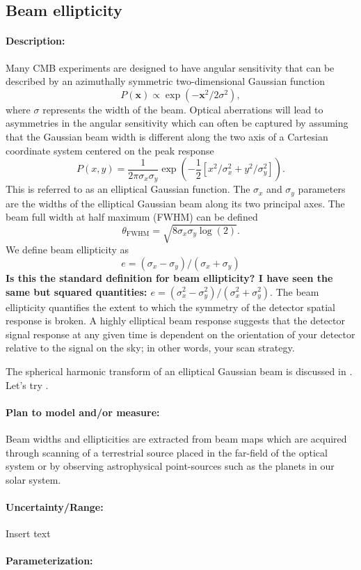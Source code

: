\subsection{Beam ellipticity}

\paragraph{Description:}
Many CMB experiments are designed to have angular sensitivity that can be described by an azimuthally symmetric two-dimensional Gaussian function
\begin{equation} 
P (\mathbf{x}) \propto \exp (-\mathbf{x} ^2/2\sigma ^2),
\end{equation}
where $\sigma$ represents the width of the beam. Optical aberrations will lead to asymmetries in the angular sensitivity which can often be captured by assuming that the Gaussian beam width is different along the two axis of a Cartesian coordinate system centered on the peak response
\begin{equation}
P (x,y) = \frac{1}{2\pi \sigma_x \sigma_y} \exp (-\frac{1}{2}[x^2/\sigma ^2_x + y^2/\sigma ^2_y]).
\end{equation}
This is referred to as an elliptical Gaussian function. The $\sigma_x$ and $\sigma_y$ parameters are the widths of the elliptical Gaussian beam along its two principal axes. The beam full width at half maximum (FWHM) can be defined 
\begin{equation}
\theta _\mathrm{FWHM} = \sqrt{8\sigma_x \sigma_y\log{(2)}}. 
\end{equation}
We define beam ellipticity as 
\begin{equation}
e = (\sigma_x-\sigma_y)/(\sigma_x+\sigma_y)
\end{equation}
\textbf{Is this the standard definition for beam ellipticity? I have seen the same but squared quantities: $e = (\sigma_x^2-\sigma_y^2)/(\sigma_x^2+\sigma_y^2)$}. The beam ellipticity quantifies the extent to which the symmetry of the detector spatial response is broken. A highly elliptical beam response suggests that the detector signal response at any given time is dependent on the orientation of your detector relative to the signal on the sky; in other words, your scan strategy.

The spherical harmonic transform of an elliptical Gaussian beam is discussed in \cite{Souradeep2001}. Let's try \cite{Takahashi2010}.

\paragraph{Plan to model and/or measure:}
Beam widths and ellipticities are extracted from beam maps which are acquired through scanning of a terrestrial source placed in the far-field of the optical system or by observing astrophysical point-sources such as the planets in our solar system.

\paragraph{Uncertainty/Range:}
Insert text

\paragraph{Parameterization:}
